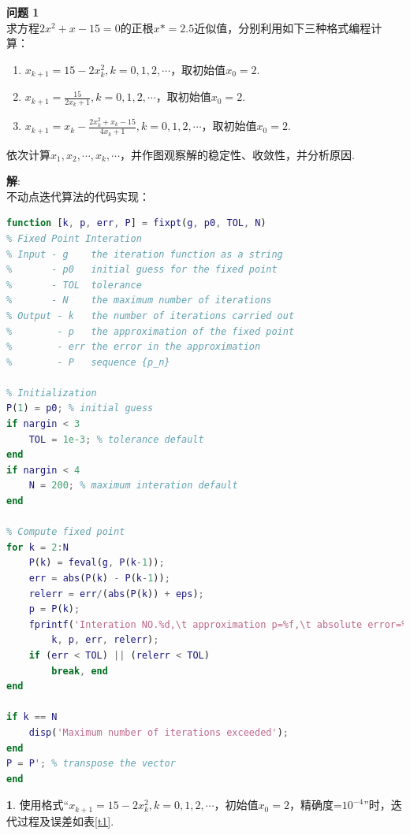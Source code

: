 \documentclass[UTF8]{ctexart}
\newenvironment{problem}[2][问题]
{\begin{mdframed}[backgroundcolor=gray!20] \textbf{#1 #2} \\}
	{\end{mdframed}}
\begin{document}
\begin{problem}{1}
求方程$2 x^{2}+x-15=0$的正根$x*=2.5$近似值，分别利用如下三种格式编程计算：
\begin{enumerate}
	\item $x_{k+1}=15-2x_{k}^{2}, k=0,1,2, \cdots$，取初始值$x_{0}=2$.
	\item $x_{k+1}=\frac{15}{2 x_{k}+1}, k=0,1,2, \cdots$，取初始值$x_{0}=2$.
	\item $x_{k+1}=x_{k}-\frac{2 x_{k}^{2}+x_{k}-15}{4 x_{k}+1}, k=0,1,2, \cdots$，取初始值$x_{0}=2$.
\end{enumerate}
依次计算$x_{1},x_{2}, \cdots,x_{k}, \cdots$，并作图观察解的稳定性、收敛性，并分析原因.
\end{problem}
\textbf{解}:\\
不动点迭代算法的代码实现：
\begin{lstlisting}[language=matlab]
function [k, p, err, P] = fixpt(g, p0, TOL, N)
% Fixed Point Interation
% Input - g    the iteration function as a string
%       - p0   initial guess for the fixed point
%       - TOL  tolerance
%       - N    the maximum number of iterations
% Output - k   the number of iterations carried out
%        - p   the approximation of the fixed point
%        - err the error in the approximation
%        - P   sequence {p_n}

% Initialization
P(1) = p0; % initial guess
if nargin < 3
	TOL = 1e-3; % tolerance default
end
if nargin < 4
	N = 200; % maximum interation default
end

% Compute fixed point
for k = 2:N
	P(k) = feval(g, P(k-1));
	err = abs(P(k) - P(k-1));
	relerr = err/(abs(P(k)) + eps);
	p = P(k);
	fprintf('Interation NO.%d,\t approximation p=%f,\t absolute error=%f,\t relative error=%f\n',...
		k, p, err, relerr);
	if (err < TOL) || (relerr < TOL)
		break, end
end

if k == N
	disp('Maximum number of iterations exceeded');
end
P = P'; % transpose the vector
end
\end{lstlisting}
\textbf{1}. 使用格式“$x_{k+1}=15-2x_{k}^{2}, k=0,1,2, \cdots$，初始值$x_{0}=2$，精确度=$10^{-4}$”时，迭代过程及误差如表\ref{t1}.
\end{document}
